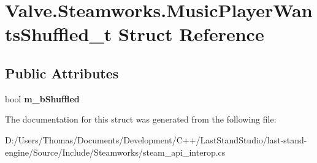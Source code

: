 \hypertarget{structValve_1_1Steamworks_1_1MusicPlayerWantsShuffled__t}{}\section{Valve.\+Steamworks.\+Music\+Player\+Wants\+Shuffled\+\_\+t Struct Reference}
\label{structValve_1_1Steamworks_1_1MusicPlayerWantsShuffled__t}
\subsection*{Public Attributes}
\begin{DoxyCompactItemize}
\item 
\hypertarget{structValve_1_1Steamworks_1_1MusicPlayerWantsShuffled__t_ac54b0144d1314399a7d3c8adddd75dd7}{}bool {\bfseries m\+\_\+b\+Shuffled}\label{structValve_1_1Steamworks_1_1MusicPlayerWantsShuffled__t_ac54b0144d1314399a7d3c8adddd75dd7}

\end{DoxyCompactItemize}


The documentation for this struct was generated from the following file\+:\begin{DoxyCompactItemize}
\item 
D\+:/\+Users/\+Thomas/\+Documents/\+Development/\+C++/\+Last\+Stand\+Studio/last-\/stand-\/engine/\+Source/\+Include/\+Steamworks/steam\+\_\+api\+\_\+interop.\+cs\end{DoxyCompactItemize}
